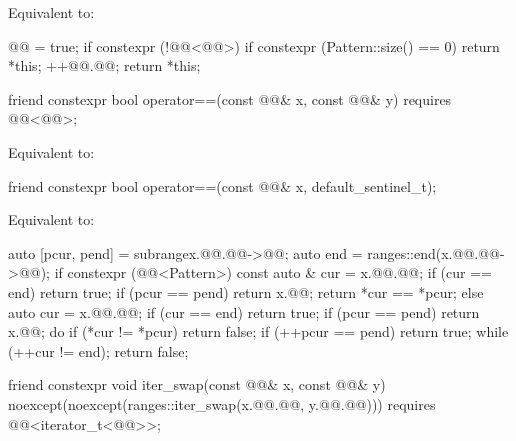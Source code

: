 \begin{itemdescr}
\pnum
\effects
Equivalent to:
\begin{codeblock}
@@ = true;
if constexpr (!@@<@@>) {
  if constexpr (Pattern::size() == 0) {
    return *this;
  }
}
++@@.@@;
return *this;
\end{codeblock}
\end{itemdescr}

%
\begin{itemdecl}
friend constexpr bool operator==(const @@& x, const @@& y)
  requires @@<@@>;
\end{itemdecl}

\begin{itemdescr}
\pnum
\effects
Equivalent to: 
\end{itemdescr}

%
\begin{itemdecl}
friend constexpr bool operator==(const @@& x, default_sentinel_t);
\end{itemdecl}

\begin{itemdescr}
\pnum
\effects
Equivalent to:
\begin{codeblock}
auto [pcur, pend] = subrange{x.@@.@@->@@};
auto end = ranges::end(x.@@.@@->@@);
if constexpr (@@<Pattern>) {
  const auto & cur = x.@@.@@;
  if (cur == end) return true;
  if (pcur == pend) return x.@@;
  return *cur == *pcur;
} else {
  auto cur = x.@@.@@;
  if (cur == end) return true;
  if (pcur == pend) return x.@@;
  do {
    if (*cur != *pcur) return false;
    if (++pcur == pend) return true;
  } while (++cur != end);
  return false;
}
\end{codeblock}
\end{itemdescr}

%
\begin{itemdecl}
friend constexpr void iter_swap(const @@& x, const @@& y)
  noexcept(noexcept(ranges::iter_swap(x.@@.@@, y.@@.@@)))
  requires @@<iterator_t<@@>>;
\end{itemdecl}

